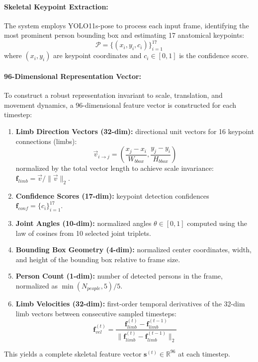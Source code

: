\documentclass[12pt]{article}
\begin{document}
\paragraph{Skeletal Keypoint Extraction:}
The system employs YOLO11s-pose \citep{Jocher_Ultralytics_YOLO_2023} to process each input frame, identifying the most prominent person bounding box and estimating 17 anatomical keypoints:
\[
\mathcal{P} = \{(x_i, y_i, c_i)\}_{i=1}^{17}
\]
where $(x_i, y_i)$ are keypoint coordinates and $c_i \in [0,1]$ is the confidence score.

\paragraph{96-Dimensional Representation Vector:}
To construct a robust representation invariant to scale, translation, and movement dynamics, a 96-dimensional feature vector is constructed for each timestep:
\begin{enumerate}
    \item \textbf{Limb Direction Vectors (32-dim):} directional unit vectors for 16 keypoint connections (limbs):
    \[
    \vec{v}_{i \to j} = \left(\frac{x_j - x_i}{W_{bbox}}, \frac{y_j - y_i}{H_{bbox}}\right)
    \]
    normalized by the total vector length to achieve scale invariance: $\mathbf{f}_{limb} = \vec{v} / \|\vec{v}\|_2$.
    \item \textbf{Confidence Scores (17-dim):} keypoint detection confidences $\mathbf{f}_{conf} = \{c_i\}_{i=1}^{17}$.
    \item \textbf{Joint Angles (10-dim):} normalized angles $\theta \in [0, 1]$ computed using the law of cosines from 10 selected joint triplets.
    \item \textbf{Bounding Box Geometry (4-dim):} normalized center coordinates, width, and height of the bounding box relative to frame size.
    \item \textbf{Person Count (1-dim):} number of detected persons in the frame, normalized as $\min(N_{people}, 5)/5$.
    \item \textbf{Limb Velocities (32-dim):} first-order temporal derivatives of the 32-dim limb vectors between consecutive sampled timesteps:
    \[
    \mathbf{f}_{vel}^{(t)} = \frac{\mathbf{f}_{limb}^{(t)} - \mathbf{f}_{limb}^{(t-1)}}{\|\mathbf{f}_{limb}^{(t)} - \mathbf{f}_{limb}^{(t-1)}\|_2}
    \]
\end{enumerate}
This yields a complete skeletal feature vector $\mathbf{s}^{(t)} \in \mathbb{R}^{96}$ at each timestep.
\end{document}
